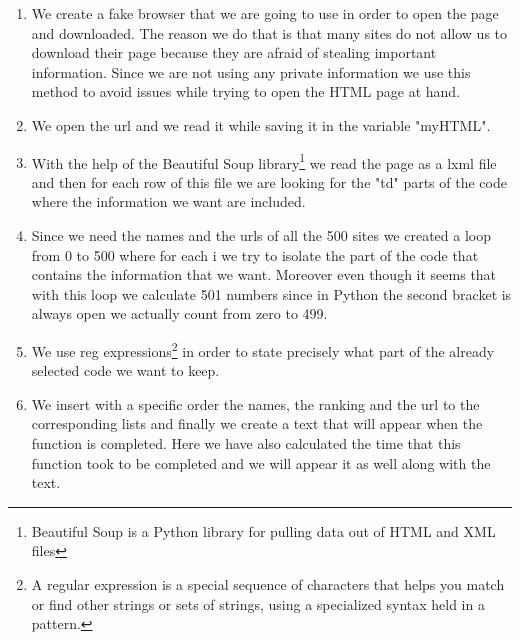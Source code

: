 \documentclass{book}
\begin{document}
\begin{enumerate}
\item We create a fake browser that we are going to use in order to open the page and downloaded. The reason we do that is that many sites do not allow us to download their page because they are afraid of stealing important information. Since we are not using any private information we use this method to avoid issues while trying to open the HTML page at hand. 
\item We open the url and we read it while saving it in the variable "myHTML".
\item With the help of the Beautiful Soup library\footnote{Beautiful Soup is a Python library for pulling data out of HTML and XML files} we read the page as a lxml file and then for each row of this file we are looking for the "td" parts of the code where the information we want are included.
\item Since we need the names and the urls of all the 500 sites we created a loop from 0 to 500 where for each i we try to isolate the part of the code that contains the information that we want. Moreover even though it seems that with this loop we calculate 501 numbers since in Python the second bracket is always open we actually count from zero to 499.
\item We use reg expressions\footnote{A regular expression is a special sequence of characters that helps you match or find other strings or sets of strings, using a specialized syntax held in a pattern.} in order to state precisely what part of the already selected code we want to keep.
\item We insert with a specific order the names, the ranking and the url to the corresponding lists and finally we create a text that will appear when the function is completed. Here we have also calculated the time that this function took to be completed and we will appear it as well along with the text.
\end{enumerate}
\end{document}
